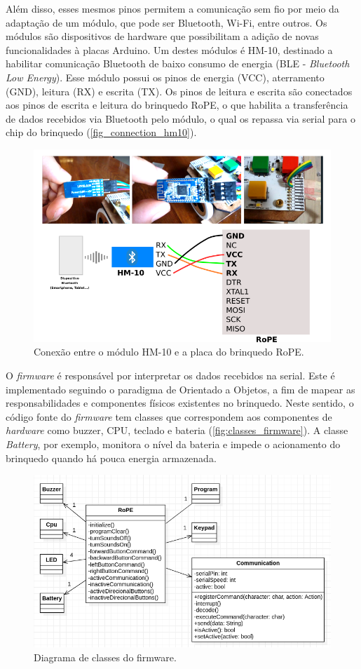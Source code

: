 Além disso, esses mesmos pinos permitem a comunicação sem fio por meio da adaptação de um módulo, que pode ser Bluetooth, Wi-Fi, entre outros. Os módulos são dispositivos de hardware que possibilitam a adição de novas funcionalidades à placas Arduino. Um destes módulos é HM-10, destinado a habilitar comunicação Bluetooth de baixo consumo de energia (BLE - \textit{Bluetooth Low Energy}). Esse módulo possui os pinos de energia (VCC), aterramento (GND), leitura (RX) e escrita (TX). Os pinos de leitura e escrita são conectados aos pinos de escrita e leitura do brinquedo RoPE, o que habilita a transferência de dados recebidos via Bluetooth pelo módulo, o qual os repassa via serial para o chip do brinquedo (\autoref{fig_connection_hm10}).

\begin{figure}[!h]
    \centering
    \includegraphics[width=.8\linewidth,fbox]{figs/connection_rope_hm10.png}
    \caption{Conexão entre o módulo HM-10 e a placa do brinquedo RoPE.}
    \label{fig_connection_hm10}
    \sourceauthor
\end{figure}

O \textit{firmware} é responsável por interpretar os dados recebidos na serial. Este é implementado seguindo o paradigma de Orientado a Objetos, a fim de mapear as responsabilidades e componentes físicos existentes no brinquedo. Neste sentido, o código fonte do \textit{firmware} tem classes que correspondem aos componentes de \textit{hardware} como buzzer, CPU, teclado e bateria (\autoref{fig:classes_firmware}). A classe \textit{Battery}, por exemplo, monitora o nível da bateria e impede o acionamento do brinquedo quando há pouca energia armazenada.

\begin{figure}[!h]
    \centering
    \includegraphics[width=.7\linewidth,fbox]{figs/class_diagram_firmware.png}
    \caption{Diagrama de classes do firmware.}
    \label{fig:classes_firmware}
    \sourceauthor
\end{figure}

